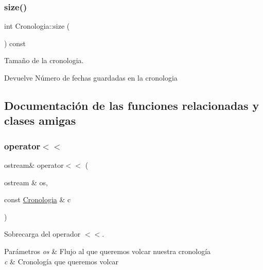 \subsubsection{\texorpdfstring{size()}{size()}}
{\footnotesize\ttfamily int Cronologia\+::size (\begin{DoxyParamCaption}{ }\end{DoxyParamCaption}) const}



Tamaño de la cronologia. 

\begin{DoxyReturn}{Devuelve}
Número de fechas guardadas en la cronologia 
\end{DoxyReturn}


\subsection{Documentación de las funciones relacionadas y clases amigas}
\mbox{\label{classCronologia_a5a590e2ec95cc4489c3de5b03e2cac4c}} 
\subsubsection{\texorpdfstring{operator$<$$<$}{operator<<}}
{\footnotesize\ttfamily ostream\& operator$<$$<$ (\begin{DoxyParamCaption}\item[{ostream \&}]{os,  }\item[{const \hyperlink{classCronologia}{Cronologia} \&}]{c }\end{DoxyParamCaption})\hspace{0.3cm}{\ttfamily [friend]}}



Sobrecarga del operador $<$$<$. 


\begin{DoxyParams}{Parámetros}
{\em os} & Flujo al que queremos volcar nuestra cronología \\
\hline
{\em c} & Cronología que queremos volcar \\
\hline
\end{DoxyParams}
\mbox{\label{classCronologia_a6fa0f1131309b1cee355b9d8297ea33d}} 
